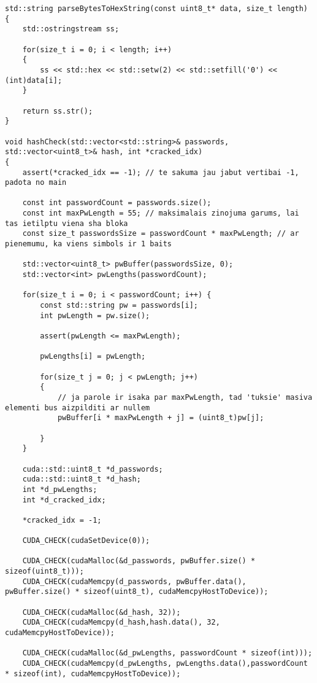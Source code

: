 \documentclass[12pt]{report}%
\theoremstyle{definition}
\begin{document}
\begin{lstlisting}[caption={Paroļu lauzēja implementācija CUDA vidē},
  label=lst:cuda_impl,
  captionpos=t
  ]
std::string parseBytesToHexString(const uint8_t* data, size_t length)
{
    std::ostringstream ss;
    
    for(size_t i = 0; i < length; i++)
    {
        ss << std::hex << std::setw(2) << std::setfill('0') << (int)data[i];
    }

    return ss.str();
}

void hashCheck(std::vector<std::string>& passwords, std::vector<uint8_t>& hash, int *cracked_idx)
{
    assert(*cracked_idx == -1); // te sakuma jau jabut vertibai -1, padota no main

    const int passwordCount = passwords.size();
    const int maxPwLength = 55; // maksimalais zinojuma garums, lai tas ietilptu viena sha bloka
    const size_t passwordsSize = passwordCount * maxPwLength; // ar pienemumu, ka viens simbols ir 1 baits

    std::vector<uint8_t> pwBuffer(passwordsSize, 0);
    std::vector<int> pwLengths(passwordCount);

    for(size_t i = 0; i < passwordCount; i++) {
        const std::string pw = passwords[i];
        int pwLength = pw.size();

        assert(pwLength <= maxPwLength);

        pwLengths[i] = pwLength;
        
        for(size_t j = 0; j < pwLength; j++)
        {
            // ja parole ir isaka par maxPwLength, tad 'tuksie' masiva elementi bus aizpilditi ar nullem
            pwBuffer[i * maxPwLength + j] = (uint8_t)pw[j]; 

        }
    }

    cuda::std::uint8_t *d_passwords;
    cuda::std::uint8_t *d_hash;
    int *d_pwLengths;
    int *d_cracked_idx;

    *cracked_idx = -1;
    
    CUDA_CHECK(cudaSetDevice(0));

    CUDA_CHECK(cudaMalloc(&d_passwords, pwBuffer.size() * sizeof(uint8_t)));
    CUDA_CHECK(cudaMemcpy(d_passwords, pwBuffer.data(), pwBuffer.size() * sizeof(uint8_t), cudaMemcpyHostToDevice));

    CUDA_CHECK(cudaMalloc(&d_hash, 32));
    CUDA_CHECK(cudaMemcpy(d_hash,hash.data(), 32, cudaMemcpyHostToDevice));

    CUDA_CHECK(cudaMalloc(&d_pwLengths, passwordCount * sizeof(int)));
    CUDA_CHECK(cudaMemcpy(d_pwLengths, pwLengths.data(),passwordCount * sizeof(int), cudaMemcpyHostToDevice));


\end{lstlisting}
\end{document}

